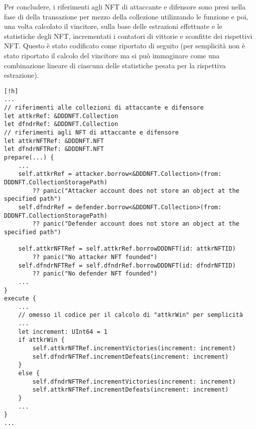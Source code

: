 Per concludere, i riferimenti agli NFT di attaccante e difensore sono presi nella fase di  della transazione per mezzo della collezione utilizzando le funzione  e  poi, una volta calcolato il vincitore, sulla base delle estrazioni effettuate e le statistiche degli NFT, incrementati i contatori di vittorie e sconfitte dei rispettivi NFT. Questo è stato codificato come riportato di seguito (per semplicità non è stato riportato il calcolo del vincitore ma si può immaginare come una combinazione lineare di ciascuna delle statistiche pesata per la rispettiva estrazione).
\begin{lstlisting}[style=all, style=cadence][!h]
...
// riferimenti alle collezioni di attaccante e difensore
let attkrRef: &DDDNFT.Collection
let dfndrRef: &DDDNFT.Collection
// riferimenti agli NFT di attaccante e difensore
let attkrNFTRef: &DDDNFT.NFT
let dfndrNFTRef: &DDDNFT.NFT
prepare(...) {
	...
    self.attkrRef = attacker.borrow<&DDDNFT.Collection>(from: DDDNFT.CollectionStoragePath) 
    	?? panic("Attacker account does not store an object at the specified path")
    self.dfndrRef = defender.borrow<&DDDNFT.Collection>(from: DDDNFT.CollectionStoragePath)
        ?? panic("Defender account does not store an object at the specified path")

    self.attkrNFTRef = self.attkrRef.borrowDDDNFT(id: attkrNFTID) 
        ?? panic("No attacker NFT founded")
    self.dfndrNFTRef = self.dfndrRef.borrowDDDNFT(id: dfndrNFTID) 
        ?? panic("No defender NFT founded")
    ...
}
execute {
	...
	// omesso il codice per il calcolo di "attkrWin" per semplicità
	...
    let increment: UInt64 = 1
    if attkrWin {
        self.attkrNFTRef.incrementVictories(increment: increment)
        self.dfndrNFTRef.incrementDefeats(increment: increment)
    }
    else {
        self.dfndrNFTRef.incrementVictories(increment: increment)
        self.attkrNFTRef.incrementDefeats(increment: increment)
    }
    ...
}
...
\end{lstlisting}